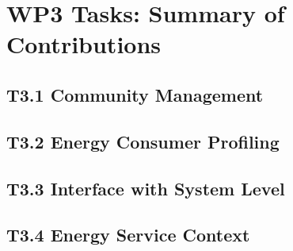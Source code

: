 \section{WP3 Tasks: Summary of Contributions}

\subsection{T3.1 Community Management}
\subsection{T3.2 Energy Consumer Profiling}
\subsection{T3.3 Interface with System Level}
\subsection{T3.4 Energy Service Context}